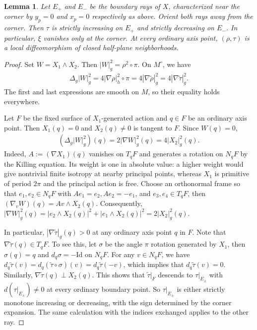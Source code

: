 \documentclass[letterpaper]{amsart}
\newtheorem{lem}[thm]{Lemma}
\theoremstyle{definition}
\theoremstyle{remark}
\begin{document}
\begin{lem}\label{lem-axis}
	Let $E_{+}$ and $E_{-}$ be the boundary rays of $X$, characterized near the corner by $y_p = 0$ and $x_p=0$ respectively as above. Orient both rays away from the corner. Then $\tau$ is strictly increasing on $E_+$ and strictly decreasing on $E_-$. In particular, $\xi $ vanishes only at the corner. At every ordinary axis point, $(\rho , \tau )$ is a local diffeomorphism of closed half-plane neighborhoods.
\end{lem}

\begin{proof}
Set $W= X_1 \wedge X_2$. Then $|W|^2_{g} = \rho ^2 \circ \pi $. On $M ^{\circ}$, we have
\begin{align*}
	\Delta _{g} |W|_g^2 = 4 | \nabla \rho |^2_{h} \circ \pi = 4 | \nabla \tilde{\rho }|^2_g = 4 |\nabla \tilde{\tau }|^2_g.
\end{align*} 
The first and last expressions are smooth on $M$, so their equality holds everywhere. 

Let $F$ be the fixed surface of $X_1$-generated action and $q \in F$ be an ordinary axis point. Then $X_1(q) =0$ and $X_2(q) \neq 0$ is tangent to $F$. Since $W(q) = 0$,
\begin{align*}
	(\Delta _g |W| ^2_g)(q) = 2 |\nabla W|^2_g(q) = 4 |X_2|^2_g(q).
\end{align*}
Indeed, $A:=(\nabla X_1)(q)$ vanishes on $T_qF$ and generates a rotation on $N_qF$ by the Killing equation. Its weight is one in absolute value: a higher weight would give nontrivial finite isotropy at nearby principal points, whereas $X_1$ is primitive of period $2\pi$ and the principal action is free. Choose an orthonormal frame so that $e_1, e_2 \in N_q F$ with $A e_1 = e_2, A e_2 = - e_1$, and $e_3, e_4 \in T_q F$, then $(\nabla _{v} W) (q) = A v \wedge X_2(q)$. Consequently, $|\nabla W|^2_g(q) = |e_2 \wedge X_2(q)|^2 + |e_1 \wedge X_2(q)|^2 = 2|X_2|_g^2(q).$

In particular, $|\nabla \tilde{\tau }|_g(q)>0$ at any ordinary axis point $q$ in $F$. Note that $\nabla \tilde{\tau }(q) \in T_q F$. To see this, let $\sigma $ be the angle $\pi $ rotation generated by $X_1$, then $\sigma (q) = q$ and $d_q \sigma = - \mathrm{Id}$ on $N_q F$. For any $v \in N_q F$, we have $d_q \tilde{\tau }(v) = d_q (\tilde{\tau }\circ \sigma )(v) = d_q \tilde{\tau } (- v)$, which implies that $d_q \tilde{\tau }(v) =0$. Similarly, $\nabla \tilde{\tau }(q) \perp X_2(q)$. This shows that $\tilde{\tau }|_{F}$ descends to $\tau |_{E_{\pm}}$ with $d (\tau |_{E_{\pm}}) \neq 0$ at every ordinary boundary point. So $\tau |_{E_{\pm}}$ is either strictly monotone increasing or decreasing, with the sign determined by the corner expansion. The same calculation with the indices exchanged applies to the other ray.


\end{proof}
\end{document}
